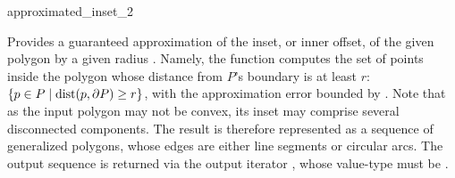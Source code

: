 
\ccRefPageBegin

\begin{ccRefFunction}{approximated_inset_2}


   {Provides a guaranteed approximation of the inset, or inner offset, of
    the given polygon  by a given radius . Namely, the
    function computes the set of points inside the polygon whose distance
    from $P$'s boundary is at least $r$:
    $\{ p \in P \;|\; {\rm dist}(p, \partial P) \geq r \}$,
    with the approximation error bounded by .
    Note that as the input polygon may not be convex, its inset may comprise
    several disconnected components. The result is therefore represented as a
    sequence of generalized polygons, whose edges are either line segments or
    circular arcs.
    The output sequence is returned via the output iterator , whose
    value-type must be .
    }

\end{ccRefFunction}

\ccRefPageEnd
